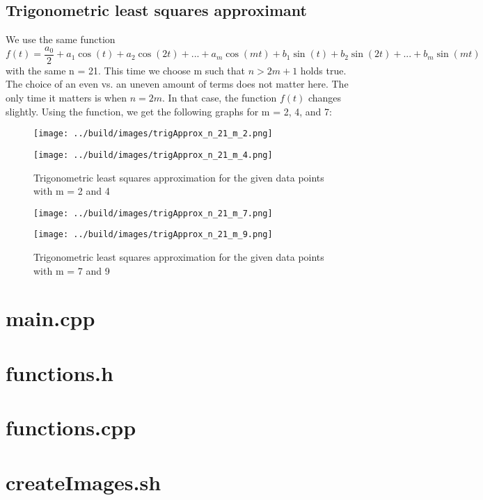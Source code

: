 \documentclass[11pt, a4paper, titlepage, openright]{article}
\begin{document}
\subsection{Trigonometric least squares approximant}
We use the same function
    \[ f(t) = \frac{a_0}{2} + a_1 \cos (t) + a_2 \cos(2t) + ... + a_m \cos(mt) + b_1 \sin (t) + b_2 \sin (2t) + ... + b_m \sin (mt) \]
with the same n = 21. This time we choose m such that \( n > 2m+1 \) holds true. The choice of an even vs. an uneven amount
of terms does not matter here. The only time it matters is when \( n = 2m \). In that case, the function \( f(t) \) changes slightly.
Using the function, we get the following graphs for m = 2, 4, and 7:
    \begin{figure}[H]
        \begin{minipage}[b]{0.49\textwidth}
            \texttt{[image: ../build/images/trigApprox\_n\_21\_m\_2.png]}
        \end{minipage}
        \hfill
        \begin{minipage}[b]{0.49\textwidth}
            \texttt{[image: ../build/images/trigApprox\_n\_21\_m\_4.png]}
        \end{minipage}
        \caption{Trigonometric least squares approximation for the given data points with m = 2 and 4}
        \label{fig:results4}
    \end{figure}
    \begin{figure}[H]
        \begin{minipage}[b]{0.49\textwidth}
            \texttt{[image: ../build/images/trigApprox\_n\_21\_m\_7.png]}
        \end{minipage}
        \hfill
        \begin{minipage}[b]{0.49\textwidth}
            \texttt{[image: ../build/images/trigApprox\_n\_21\_m\_9.png]}
        \end{minipage}
        \caption{Trigonometric least squares approximation for the given data points with m = 7 and 9}
        \label{fig:results4}
    \end{figure}


\onecolumn
\appendix
\appendixpage
\addappheadtotoc

\section{main.cpp}
    
    \newpage

\section{functions.h}
    

\bigskip
\section{functions.cpp}
    

\section{createImages.sh}
    
\end{document}

